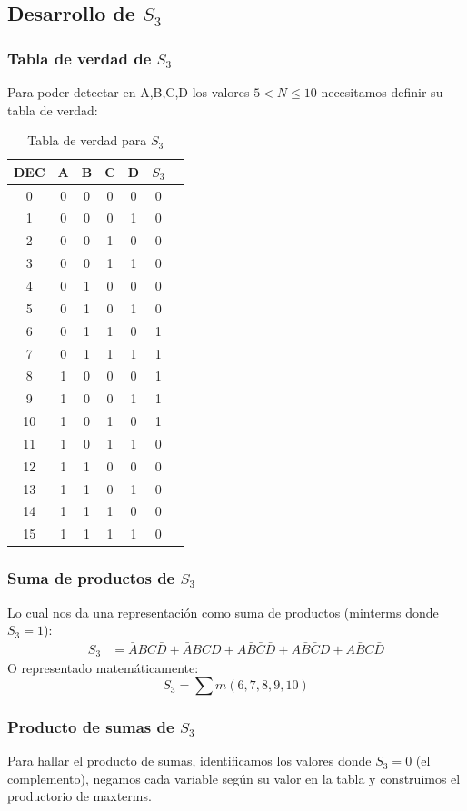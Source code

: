 \documentclass[11pt,a4paper]{article}
\newcommand{\tverdad}[4]{%
  \begin{table}[H]%
  \centering%
  \begin{tabular}{|*{#1}{c|}|*{#2}{c|}}%
    #3%
  \end{tabular}%
  \caption{#4}%
  \end{table}%
}
\begin{document}
\newpage

\subsection*{Desarrollo de $S_3$}
\subsubsection*{Tabla de verdad de $S_3$}
Para poder detectar en A,B,C,D los valores $5 < N \leq 10$ necesitamos definir su tabla de verdad:
\tverdad{6}{1}{%
  \hline
  DEC & A & B & C & D & $S_3$ \\
  \hline
  0  & 0 & 0 & 0 & 0 & 0 \\
  1  & 0 & 0 & 0 & 1 & 0 \\
  2  & 0 & 0 & 1 & 0 & 0 \\
  3  & 0 & 0 & 1 & 1 & 0 \\
  4  & 0 & 1 & 0 & 0 & 0 \\
  5  & 0 & 1 & 0 & 1 & 0 \\
  6  & 0 & 1 & 1 & 0 & 1 \\
  7  & 0 & 1 & 1 & 1 & 1 \\
  8  & 1 & 0 & 0 & 0 & 1 \\
  9  & 1 & 0 & 0 & 1 & 1 \\
  10 & 1 & 0 & 1 & 0 & 1 \\
  11 & 1 & 0 & 1 & 1 & 0 \\
  12 & 1 & 1 & 0 & 0 & 0 \\
  13 & 1 & 1 & 0 & 1 & 0 \\
  14 & 1 & 1 & 1 & 0 & 0 \\
  15 & 1 & 1 & 1 & 1 & 0 \\
  \hline%
}{Tabla de verdad para $S_3$}

\subsubsection*{Suma de productos de $S_3$}
Lo cual nos da una representación como suma de productos (minterms donde $S_3 = 1$):
\begin{align}
S_3 &= \bar{A}BC\bar{D} + \bar{A}BCD + A\bar{B}\bar{C}\bar{D} + A\bar{B}\bar{C}D + A\bar{B}C\bar{D}
\end{align}
O representado matemáticamente:
\[S_3 = \sum m(6,7,8,9,10)\]

\subsubsection*{Producto de sumas de $S_3$}
Para hallar el producto de sumas, identificamos los valores donde $S_3 = 0$ (el complemento), negamos cada variable según su valor en la tabla y construimos el productorio de maxterms.
\end{document}
